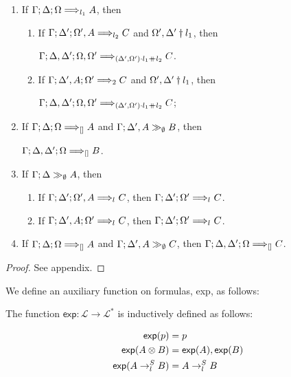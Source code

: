 \begin{theorem}\label{focusedcutelim}
  \begin{enumerate}
  \item If $\Gamma; \Delta; \Omega \Longrightarrow_{l_{1}} A$, then
    \begin{enumerate}
    \item If $\Gamma; \Delta'; \Omega', A \Longrightarrow_{l_{2}} C$ and
      $\Omega', \Delta' \dagger l_{1}$, then

      $\Gamma; \Delta, \Delta'; \Omega, \Omega' \Longrightarrow_{
        (\Delta',\Omega') \cdot l_{1} \mathbin{+\mkern-10mu+} l_{2}} C$.
    \item If $\Gamma; \Delta', A; \Omega' \Longrightarrow_{2} C$ and
      $\Omega', \Delta' \dagger l_{1}$, then

      $\Gamma; \Delta, \Delta'; \Omega, \Omega' \Longrightarrow_{
        (\Delta', \Omega') \cdot l_{1} \mathbin{+\mkern-10mu+} l_{2}} C$;
    \end{enumerate}

  \item If $\Gamma; \Delta; \Omega \Longrightarrow_{[]} A$ and
    $\Gamma; \Delta', A \gg_{\emptyset} B$, then

    $\Gamma; \Delta, \Delta'; \Omega \Longrightarrow_{[]} B$.

  \item If $\Gamma; \Delta \gg_{\emptyset} A$, then
    \begin{enumerate}
    \item If $\Gamma; \Delta'; \Omega', A \Longrightarrow_{l_{}} C$, then
      $\Gamma; \Delta'; \Omega' \Longrightarrow_{l_{}} C$.
    \item If $\Gamma; \Delta', A; \Omega' \Longrightarrow_{l_{}} C$, then
      $\Gamma; \Delta'; \Omega' \Longrightarrow_{l_{}} C$.
    \end{enumerate}
  \item If $\Gamma; \Delta; \Omega \Longrightarrow_{[]} A$ and
    $\Gamma; \Delta', A \gg_{\emptyset} C$, then
    $\Gamma; \Delta, \Delta'; \Omega \Longrightarrow_{[]} C$.
  \end{enumerate}
\end{theorem}
\begin{proof}
  See appendix.
\end{proof}


We define an auxiliary function on formulas, \textsf{exp}, as follows:

\begin{definition}
  The function $\textsf{exp} : \mathcal{L} \to \mathcal{L}^*$ is inductively
  defined as follows:

\begin{align*}
  \textsf{exp}(p) & = p \\
  \textsf{exp}(A \otimes B) & = \textsf{exp}(A), \textsf{exp}(B) \\
  \textsf{exp}(A \rightarrow_{l_{}}^S B) & = A \rightarrow_{l_{}}^S B
\end{align*}
\end{definition}

